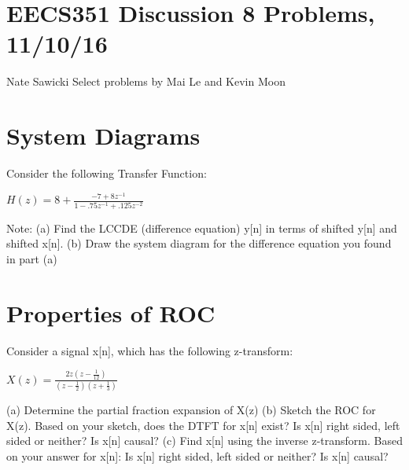 \documentclass[11pt]{article}
\begin{document}
\section*{EECS351 Discussion 8 Problems, 11/10/16}
Nate Sawicki \newline
Select problems by Mai Le and Kevin Moon


\section{System Diagrams}

Consider the following Transfer Function:

\vspace{3mm}
\begin{center}

$
H(z) = 8 + \frac{-7+8z^{-1}}{1 - .75z^{-1} + .125z^{-2}}
$
\end{center}

\vspace{3mm}

Note:\newline
(a) Find the LCCDE (difference equation) y[n] in terms of shifted y[n] and shifted x[n]. \newline
(b) Draw the system diagram for the difference equation you found in part (a)

\vspace{3mm}

\section{Properties of ROC}
Consider a signal x[n], which has the following z-transform:
\vspace{2mm}

\begin{center}

$
X(z) = \frac{2z(z-\frac{1}{12})}{(z-\frac{1}{2})(z+\frac{1}{3})}
$
\end{center}

\vspace{3mm}

(a) Determine the partial fraction expansion of X(z)\newline
(b) Sketch the ROC for X(z). Based on your sketch, does the DTFT for x[n] exist? Is x[n] right sided, left sided or neither? Is x[n] causal?\newline
(c) Find x[n] using the inverse z-transform. Based on your answer for x[n]: Is x[n] right sided, left sided or neither? Is x[n] causal?\newline
\end{document}
